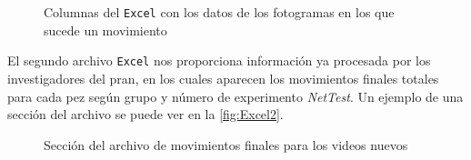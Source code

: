 \begin{figure}[H]
    \centering
    \caption{Columnas del \texttt{Excel} con los datos de los fotogramas en los que sucede un movimiento}
    \label{fig:Excel1}
\end{figure}
El segundo archivo \texttt{Excel} nos proporciona información ya procesada por los investigadores del \acrshort{pran}, en los cuales aparecen 
los movimientos finales totales para cada pez según grupo y número de experimento \textit{NetTest}. Un ejemplo de una sección del archivo se 
puede ver en la \autoref{fig:Excel2}.

\begin{figure}[H]
    \centering
    \caption{Sección del archivo de movimientos finales para los videos nuevos}
    \label{fig:Excel2}
\end{figure}

